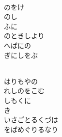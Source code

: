 \documentclass[10pt,b5j]{tarticle} %
\begin{document}
\vspace{1.5em} %
\newcommand{\linespace}{0.5em} %
\newcommand{\blocksize}{0.5\hsize} %
\newcommand{\itemmargin}{3em} %
\begin{enumerate} %
    \setlength{\itemindent}{\itemmargin} %
    \begin{minipage}[c]{\blocksize}
    
        \vspace{\linespace}
        \item~\\
        のをけ\\
        のし\\
        ふに\\
        のときしより\\
        へばにの\\
        ぎにしをぶ
        
    \end{minipage}
    \begin{minipage}[c]{\blocksize}
        
        \vspace{\linespace}
        \item~\\
        はりもやの\\
        れしのをこむ\\
        しもくに\\
        き\\
        いさごとるくづは\\
        をばめぐりるなり
        
    \end{minipage}
    \begin{minipage}[c]{\blocksize}
        

\end{minipage}
\end{enumerate}
\end{document}
